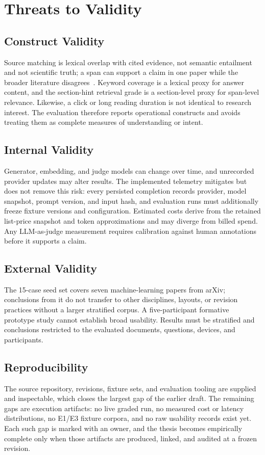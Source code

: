 \section{Threats to Validity}

\subsection{Construct Validity}

Source matching is lexical overlap with cited evidence, not semantic entailment and not scientific truth; a span can support a claim in one paper while the broader literature disagrees~\cite{wadden2020scifact}.
Keyword coverage is a lexical proxy for answer content, and the section-hint retrieval grade is a section-level proxy for span-level relevance.
Likewise, a click or long reading duration is not identical to research interest.
The evaluation therefore reports operational constructs and avoids treating them as complete measures of understanding or intent.

\subsection{Internal Validity}

Generator, embedding, and judge models can change over time, and unrecorded provider updates may alter results.
The implemented telemetry mitigates but does not remove this risk: every persisted completion records provider, model snapshot, prompt version, and input hash, and evaluation runs must additionally freeze fixture versions and configuration.
Estimated costs derive from the retained list-price snapshot and token approximations and may diverge from billed spend.
Any LLM-as-judge measurement requires calibration against human annotations before it supports a claim.

\subsection{External Validity}

The 15-case seed set covers seven machine-learning papers from arXiv; conclusions from it do not transfer to other disciplines, layouts, or revision practices without a larger stratified corpus.
A five-participant formative prototype study cannot establish broad usability.
Results must be stratified and conclusions restricted to the evaluated documents, questions, devices, and participants.

\subsection{Reproducibility}

The source repository, revisions, fixture sets, and evaluation tooling are supplied and inspectable, which closes the largest gap of the earlier draft.
The remaining gaps are execution artifacts: no live graded run, no measured cost or latency distributions, no E1/E3 fixture corpora, and no raw usability records exist yet.
Each such gap is marked \pending{} with an owner, and the thesis becomes empirically complete only when those artifacts are produced, linked, and audited at a frozen revision.
